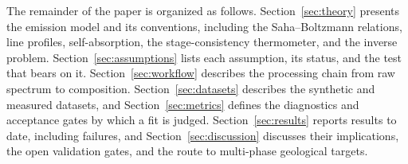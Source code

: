 The remainder of the paper is organized as follows.
Section~\ref{sec:theory} presents the emission model and its conventions, including the Saha--Boltzmann relations, line profiles, self-absorption, the stage-consistency thermometer, and the inverse problem.
Section~\ref{sec:assumptions} lists each assumption, its status, and the test that bears on it.
Section~\ref{sec:workflow} describes the processing chain from raw spectrum to composition.
Section~\ref{sec:datasets} describes the synthetic and measured datasets, and Section~\ref{sec:metrics} defines the diagnostics and acceptance gates by which a fit is judged.
Section~\ref{sec:results} reports results to date, including failures, and Section~\ref{sec:discussion} discusses their implications, the open validation gates, and the route to multi-phase geological targets.
